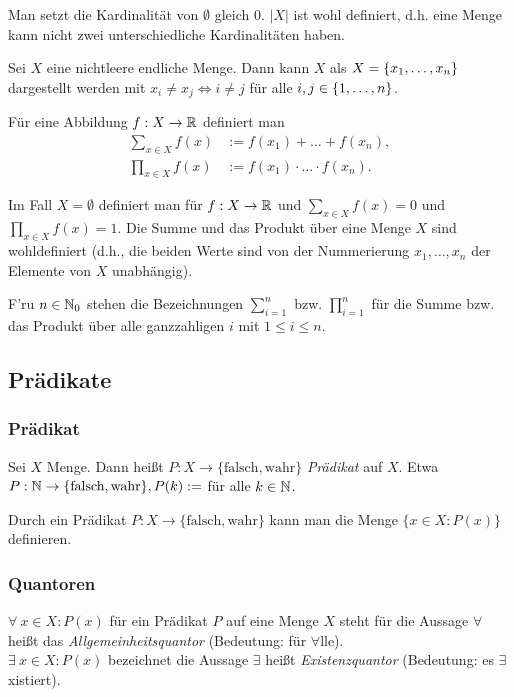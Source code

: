 Man setzt die Kardinalität von $ \emptyset $ gleich 0. $ |X| $ ist wohl definiert, d.h. eine Menge kann nicht zwei unterschiedliche Kardinalitäten haben.

Sei $ X $ eine nichtleere endliche Menge. Dann kann $ X $ als $ X = \{ x_1,\ldots,x_n \} $ dargestellt werden mit  $ x_i \neq x_j \Leftrightarrow i \neq j $ für alle $ i,j \in \{ 1,\ldots,n \} $.

Für eine Abbildung $ f : X \to \mathbb R $ definiert man
\begin{align*}
	\sum\limits_{x \in X} f(x) &:= f(x_1) + \ldots + f(x_n),
\\
	\prod\limits_{x \in X} f(x) &:= f(x_1) \cdot \ldots \cdot f(x_n).
\end{align*}

Im Fall $ X = \emptyset $ definiert man für $ f : X \to \mathbb R $ und $ \sum\limits_{x \in X} f(x) = 0 $ und $ \prod\limits_{x \in X} f(x) = 1 $. Die Summe und das Produkt über eine Menge $X$ sind wohldefiniert (d.h., die beiden Werte sind von der Nummerierung $x_1,\ldots,x_n$ der Elemente von $X$ unabhängig).

F'ru $n \in \mathbb N_0$ stehen die Bezeichnungen $\sum_{i=1}^n$ bzw. $\prod_{i=1}^n$ für die Summe bzw. das Produkt über alle ganzzahligen $i$ mit $1 \le i \le n$. 



\subsection{Prädikate}

\subsubsection{Prädikat}

Sei $ X $ Menge. Dann heißt $ P : X \to \{ \text{falsch},\text{wahr} \} $ \emph{Prädikat} auf $ X $. Etwa $ P : \mathbb N \to \{ \text{falsch},\text{wahr} \}, P(k) := $  für alle $ k \in \mathbb N $.

Durch ein Prädikat $ P : X \to \{ \text{falsch},\text{wahr} \} $ kann man die Menge $ \{ x \in X : P(x) \} $ definieren.

\subsubsection{Quantoren}

$ \forall\: x \in X : P(x) $ für ein Prädikat $ P $ auf eine Menge $ X $ steht für die Aussage  $ \forall $ heißt das \emph{Allgemeinheitsquantor} (Bedeutung: für $ \forall $lle). \\[10pt]
%
$ \exists\: x \in X : P(x) $ bezeichnet die Aussage  $ \exists $ heißt \emph{Existenzquantor} (Bedeutung: es $ \exists $xistiert).


